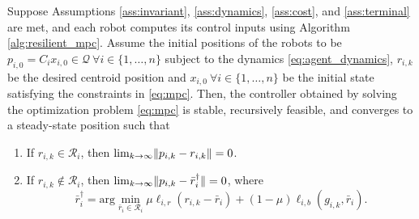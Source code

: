 \begin{theorem}
\label{th:convergence}
Suppose Assumptions \ref{ass:invariant}, \ref{ass:dynamics}, \ref{ass:cost}, and \ref{ass:terminal} are met, and each robot computes its control inputs using Algorithm \ref{alg:resilient_mpc}. Assume the initial positions of the robots to be $p_{i,0} = C_ix_{i,0} \in \mathcal{Q} \ \forall i \in \{1,\dots, n\}$ subject to the dynamics \eqref{eq:agent_dynamics}, $r_{i,k}$ be the desired centroid position and $x_{i,0} \ \forall i \in \{1,\dots, n\}$ be the initial state satisfying the constraints in \eqref{eq:mpc}. Then, the controller obtained by solving the optimization problem \eqref{eq:mpc} is stable, recursively feasible, and converges to a steady-state position such that
\begin{enumerate}
    \item If $r_{i,k}\in \mathcal{R}_i$, then $\lim_{k \rightarrow \infty} \lVert p_{i,k} - r_{i,k}\rVert = 0 $.
    \item If $r_{i,k} \notin \mathcal{R}_i$, then $\lim_{k \rightarrow \infty} \lVert p_{i,k} - \bar{r}_{i}^{\dagger}\rVert = 0 $, where
    \begin{equation*}
         \bar{r}_i^{\dagger}= \text{arg} \min_{\bar{r}_i \in \mathcal{R}_i} \mu \ell_{i,r}(r_{i,k} - \bar{r}_i) + (1-\mu)\ell_{i,b}(g_{i,k}, \bar{r}_i). 
    \end{equation*}
\end{enumerate}   
\end{theorem}

